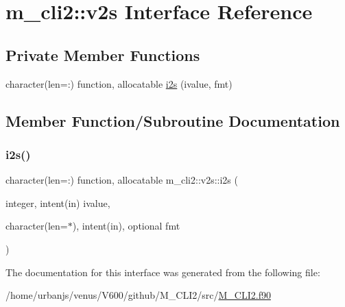\hypertarget{interfacem__cli2_1_1v2s}{}\section{m\+\_\+cli2\+:\+:v2s Interface Reference}
\label{interfacem__cli2_1_1v2s}
\subsection*{Private Member Functions}
\begin{DoxyCompactItemize}
\item 
character(len=\+:) function, allocatable \mbox{\hyperlink{interfacem__cli2_1_1v2s_a15467a4cf2f813fa65c4bbb460e04c69}{i2s}} (ivalue, fmt)
\end{DoxyCompactItemize}


\subsection{Member Function/\+Subroutine Documentation}
\mbox{\label{interfacem__cli2_1_1v2s_a15467a4cf2f813fa65c4bbb460e04c69}} 
\subsubsection{\texorpdfstring{i2s()}{i2s()}}
{\footnotesize\ttfamily character(len=\+:) function, allocatable m\+\_\+cli2\+::v2s\+::i2s (\begin{DoxyParamCaption}\item[{integer, intent(in)}]{ivalue,  }\item[{character(len=$\ast$), intent(in), optional}]{fmt }\end{DoxyParamCaption})\hspace{0.3cm}{\ttfamily [private]}}



The documentation for this interface was generated from the following file\+:\begin{DoxyCompactItemize}
\item 
/home/urbanjs/venus/\+V600/github/\+M\+\_\+\+C\+L\+I2/src/\mbox{\hyperlink{M__CLI2_8f90}{M\+\_\+\+C\+L\+I2.\+f90}}\end{DoxyCompactItemize}
